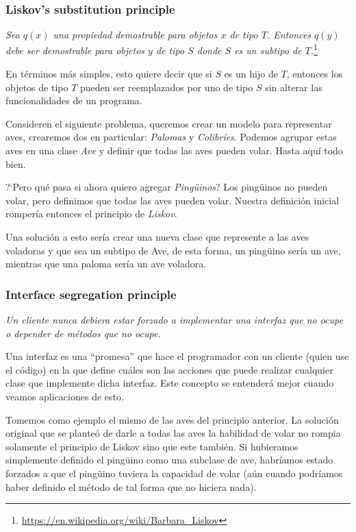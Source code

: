       \subsubsection{Liskov's substitution principle}
        \textit{Sea \(q(x)\) una propiedad demostrable para objetos \(x\) de tipo \(T\). 
        Entonces \(q(y)\) debe ser demostrable para objetos \(y\) de tipo \(S\) donde \(S\)
        es un subtipo de \(T\).}\footnote{
          \url{https://en.wikipedia.org/wiki/Barbara_Liskov}
        }

        En términos más simples, esto quiere decir que si \(S\) es un hijo de \(T\), entonces los 
        objetos de tipo \(T\) pueden ser reemplazados por uno de tipo \(S\) sin alterar las 
        funcionalidades de un programa.

        Consideren el siguiente problema, queremos crear un modelo para representar aves,
        crearemos dos en particular: \textit{Palomas} y \textit{Colibríes}.
        Podemos agrupar estas aves en una clase \textit{Ave} y definir que todas las aves
        pueden volar.
        Hasta aquí todo bien.

        ?`Pero qué pasa si ahora quiero agregar \textit{Pingüinos}?
        Los pingüinos no pueden volar, pero definimos que todas las aves pueden volar. 
        Nuestra definición inicial rompería entonces el principio de \textit{Liskov}.

        Una solución a esto sería crear una nueva clase que represente a las aves 
        voladoras y que sea un subtipo de Ave, de esta forma, un pingüino sería un ave, 
        mientras que una paloma sería un ave voladora.

      \subsubsection{Interface segregation principle}
        \textit{Un cliente nunca debiera estar forzado a implementar una interfaz que no 
        ocupe o depender de métodos que no ocupe.}

        Una interfaz es una ``promesa'' que hace el programador con un cliente (quien use 
        el código) en la que define cuáles son las acciones que puede realizar cualquier 
        clase que implemente dicha interfaz.
        Este concepto se entenderá mejor cuando veamos aplicaciones de esto.

        Tomemos como ejemplo el mismo de las aves del principio anterior.
        La solución original que se planteó de darle a todas las aves la habilidad de 
        volar no rompia solamente el principio de Liskov sino que este también.
        Si hubieramos simplemente definido el pingüino como una subclase de ave, habríamos
        estado forzados a que el pingüino tuviera la capacidad de volar (aún cuando 
        podríamos haber definido el método de tal forma que no hiciera nada).

